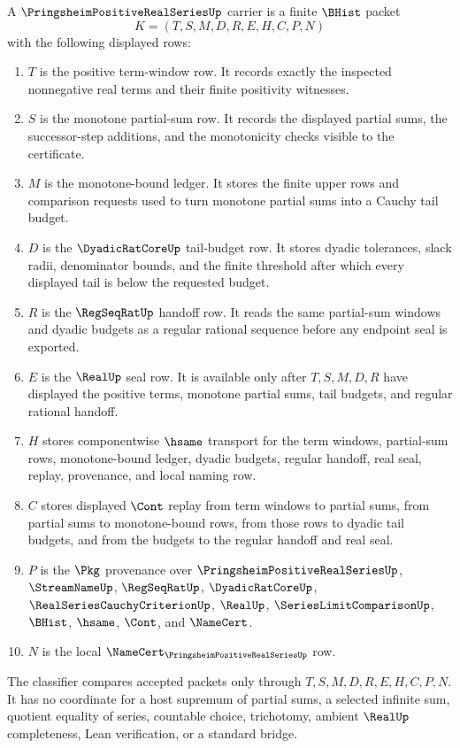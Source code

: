 \begin{definition}
\label{def:pringsheim-positive-real-series-carrier}
A $\PringsheimPositiveRealSeriesUp$ carrier is a finite $\BHist$ packet
$$
K=(T,S,M,D,R,E,H,C,P,N)
$$
with the following displayed rows:
\begin{enumerate}
\item $T$ is the positive term-window row. It records exactly the inspected nonnegative real terms and their finite positivity witnesses.
\item $S$ is the monotone partial-sum row. It records the displayed partial sums, the successor-step additions, and the monotonicity checks visible to the certificate.
\item $M$ is the monotone-bound ledger. It stores the finite upper rows and comparison requests used to turn monotone partial sums into a Cauchy tail budget.
\item $D$ is the $\DyadicRatCoreUp$ tail-budget row. It stores dyadic tolerances, slack radii, denominator bounds, and the finite threshold after which every displayed tail is below the requested budget.
\item $R$ is the $\RegSeqRatUp$ handoff row. It reads the same partial-sum windows and dyadic budgets as a regular rational sequence before any endpoint seal is exported.
\item $E$ is the $\RealUp$ seal row. It is available only after $T,S,M,D,R$ have displayed the positive terms, monotone partial sums, tail budgets, and regular rational handoff.
\item $H$ stores componentwise $\hsame$ transport for the term windows, partial-sum rows, monotone-bound ledger, dyadic budgets, regular handoff, real seal, replay, provenance, and local naming row.
\item $C$ stores displayed $\Cont$ replay from term windows to partial sums, from partial sums to monotone-bound rows, from those rows to dyadic tail budgets, and from the budgets to the regular handoff and real seal.
\item $P$ is the $\Pkg$ provenance over $\PringsheimPositiveRealSeriesUp$, $\StreamNameUp$, $\RegSeqRatUp$, $\DyadicRatCoreUp$, $\RealSeriesCauchyCriterionUp$, $\RealUp$, $\SeriesLimitComparisonUp$, $\BHist$, $\hsame$, $\Cont$, and $\NameCert$.
\item $N$ is the local $\NameCert_{\PringsheimPositiveRealSeriesUp}$ row.
\end{enumerate}
The classifier compares accepted packets only through $T,S,M,D,R,E,H,C,P,N$. It has no coordinate for a host supremum of partial sums, a selected infinite sum, quotient equality of series, countable choice, trichotomy, ambient $\RealUp$ completeness, Lean verification, or a standard bridge.
\end{definition}

